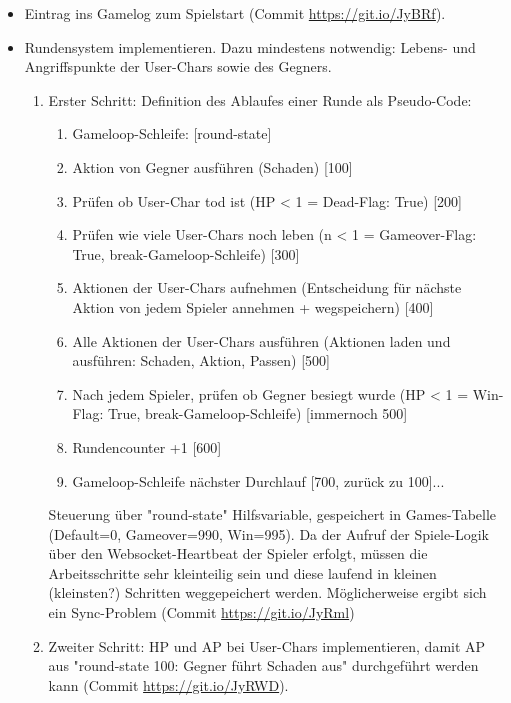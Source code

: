 \begin{itemize}
    \item Eintrag ins Gamelog zum Spielstart (Commit \url{https://git.io/JyBRf}).
    \item Rundensystem implementieren. Dazu mindestens notwendig: Lebens- und Angriffspunkte der User-Chars sowie des Gegners. 
    \begin{enumerate}
        \item Erster Schritt: Definition des Ablaufes einer Runde als Pseudo-Code: 
            \begin{enumerate}
                \item Gameloop-Schleife: [round-state]
                \item Aktion von Gegner ausführen (Schaden) [100]
                \item Prüfen ob User-Char tod ist (HP < 1 = Dead-Flag: True) [200]
                \item Prüfen wie viele User-Chars noch leben (n < 1 = Gameover-Flag: True, break-Gameloop-Schleife) [300]
                \item Aktionen der User-Chars aufnehmen (Entscheidung für nächste Aktion von jedem Spieler annehmen + wegspeichern) [400]
                \item Alle Aktionen der User-Chars ausführen (Aktionen laden und ausführen: Schaden, Aktion, Passen) [500]
                \item Nach jedem Spieler, prüfen ob Gegner besiegt wurde (HP < 1 = Win-Flag: True, break-Gameloop-Schleife) [immernoch 500]
                \item Rundencounter +1 [600]
                \item Gameloop-Schleife nächster Durchlauf [700, zurück zu 100]...
            \end{enumerate}
    Steuerung über "round-state" Hilfsvariable, gespeichert in Games-Tabelle (Default=0, Gameover=990, Win=995). Da der Aufruf der Spiele-Logik über den Websocket-Heartbeat der Spieler erfolgt, müssen die Arbeitsschritte sehr kleinteilig sein und diese laufend in kleinen (kleinsten?) Schritten weggepeichert werden. Möglicherweise ergibt sich ein Sync-Problem (Commit \url{https://git.io/JyRml})
    \item Zweiter Schritt: HP und AP bei User-Chars implementieren, damit AP aus "round-state 100: Gegner führt Schaden aus" durchgeführt werden kann (Commit \url{https://git.io/JyRWD}).  
    \end{enumerate}
\end{itemize}


